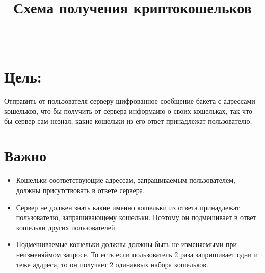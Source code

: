 \documentclass{revtex4}
\begin{document}
\title{Схема получения криптокошельков}
\maketitle
\par\rule{\textwidth}{0.05pt}
\section*{Цель:} 
Отправить от пользователя серверу шифрованное сообщение бакета с адрессами кошельков, что бы получить от сервера информаию о своих кошельках, так что бы сервер сам незнал, какие кошельки из его ответ принадлежат пользователю. 

\section*{Важно}

\begin{itemize}
    \item Кошельки соответствующие адрессам, запрашиваемым пользователем, должны присутствовать в ответе сервера. 
    \item Сервер не должен знать какие именно кошельки из ответа принадлежат пользователю, запрашивающему кошельки. Поэтому он подмешивает в ответ кошельки других пользователей. 
    \item Подмешиваемые кошельки должны должны быть не изменяемыми при неизменяймом запросе. То есть если пользователь 2 раза запришивает одни и теже аддреса, то он получает 2 одинаквых набора кошельков. 
\end {itemize}
\end{document}
